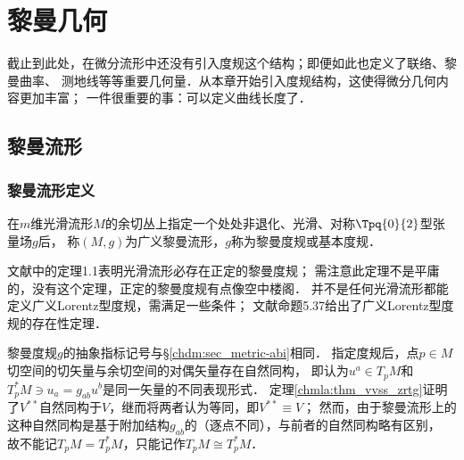 
\chapter{黎曼几何}\label{chrg}



截止到此处，在微分流形中还没有引入度规这个结构；即便如此也定义了联络、黎曼曲率、
测地线等等重要几何量．从本章开始引入度规结构，这使得微分几何内容更加丰富；
一件很重要的事：可以定义曲线长度了．


\section{黎曼流形}\label{chrg:sec_riemann}

\subsection{黎曼流形定义}\label{chrg:sec_riemann-metric}
\begin{definition}
    在$m$维光滑流形$M$的余切丛上指定一个处处非退化、光滑、对称$\Tpq{0}{2}$型张量场$g$后，
    称$(M,g)$为{\heiti 广义黎曼流形}，$g$称为{\heiti 黎曼度规}或{\heiti 基本度规}．
\end{definition}


\begin{remark}
    文献\parencite[\S 5.1]{cc2001-zh}中的定理1.1表明光滑流形必存在正定的黎曼度规；
    需注意此定理不是平庸的，没有这个定理，正定的黎曼度规有点像空中楼阁．
    并不是任何光滑流形都能定义广义Lorentz型度规，需满足一些条件；
    文献\parencite{oneill1983}命题5.37给出了广义Lorentz型度规的存在性定理．
\end{remark}

\begin{remark}
    黎曼度规$g$的抽象指标记号与\S\ref{chdm:sec_metric-abi}相同．
    指定度规后，点$p\in M$切空间的切矢量与余切空间的对偶矢量存在自然同构，
    即认为$u^a\in T_pM$和$T^*_pM \ni u_a = g_{ab}u^b$是同一矢量的不同表现形式．
    定理\ref{chmla:thm_vvss_zrtg}证明了$V^{**}$自然同构于$V$，继而将两者认为等同，即$V^{**}\equiv V$；
    然而，由于黎曼流形上的这种自然同构是基于附加结构$g_{ab}$的（逐点不同），与前者的自然同构略有区别，
    故不能记$T_pM=T^*_pM$，只能记作$T_pM\cong T^*_pM$．
\end{remark}

